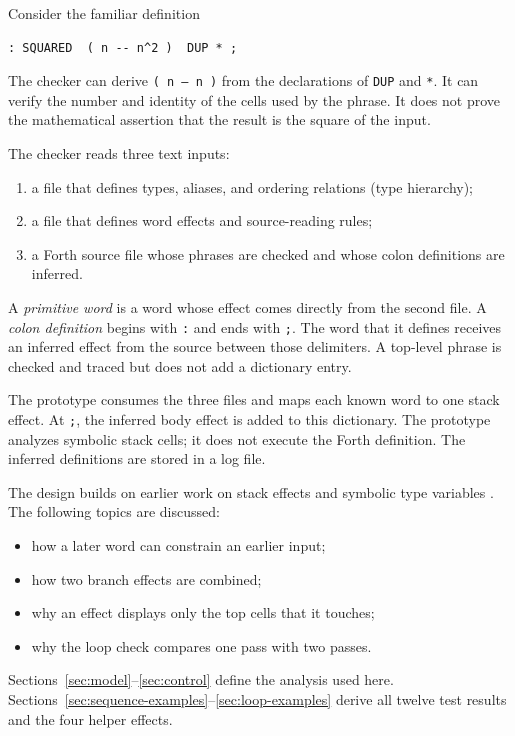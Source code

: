 \documentclass[11pt,a4paper]{article}
\begin{document}
Consider the familiar definition
\begin{verbatim}
: SQUARED  ( n -- n^2 )  DUP * ;
\end{verbatim}
The checker can derive \texttt{( n -- n )} from the declarations of
\texttt{DUP} and \texttt{*}.  It can verify the number and identity of the
cells used by the phrase.  It does not prove the mathematical assertion that
the result is the square of the input.

\begin{samepage}
The checker reads three text inputs:
\begin{enumerate}
  \item a file that defines types, aliases, and ordering relations (type hierarchy);
  \item a file that defines word effects and source-reading rules;
  \item a Forth source file whose phrases are checked and whose colon
        definitions are inferred.
\end{enumerate}
A \emph{primitive word} is a word whose effect comes directly from the second
file.  A \emph{colon definition} begins with \texttt{:} and ends with
\texttt{;}.  The word that it defines receives an inferred effect from the
source between those delimiters.  A top-level phrase is checked and traced but
does not add a dictionary entry.
\end{samepage}
The prototype consumes the three files and maps each known word to one stack
effect.  At \texttt{;}, the inferred body effect is added to this dictionary.
The prototype analyzes symbolic stack cells; it does not execute the Forth
definition. The inferred definitions are stored in a log file.

The design builds on earlier work on stack effects and symbolic type variables
\cite{poial1994,poial1992,poial2002,poial2006}.
The following topics are discussed:
\begin{itemize}
  \item how a later word can constrain an earlier input;
  \item how two branch effects are combined;
  \item why an effect displays only the top cells that it touches;
  \item why the loop check compares one pass with two passes.
\end{itemize}
Sections~\ref{sec:model}--\ref{sec:control} define the analysis used here.
Sections~\ref{sec:sequence-examples}--\ref{sec:loop-examples} derive all twelve
test results and the four helper effects.
\end{document}
